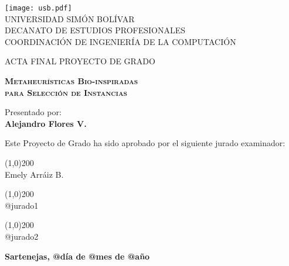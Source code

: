 \begin{titlepage}
\begin{center}

\texttt{[image: usb.pdf]} \\

\textsc {\large UNIVERSIDAD SIMÓN BOLÍVAR} \\
\textsc{DECANATO DE ESTUDIOS PROFESIONALES\\
COORDINACIÓN DE INGENIERÍA DE LA COMPUTACIÓN}

\bigskip
\bigskip
\bigskip
\bigskip
\bigskip
\bigskip

\textsc{ACTA FINAL PROYECTO DE GRADO}

\bigskip
\bigskip

\textsc{\bfseries Metaheurísticas Bio-inspiradas\\para Selección de Instancias}

\bigskip
\bigskip
\bigskip
\bigskip

\begin{minipage}{\textwidth}
\centering
Presentado por: \\
{\bfseries Alejandro Flores V.} \\

\bigskip
\bigskip
\bigskip

Este Proyecto de Grado ha sido aprobado por el siguiente jurado examinador: \\

\bigskip
\bigskip

\line(1,0){200} \\
Emely Arráiz B.\\

\bigskip
\bigskip

\line(1,0){200} \\
@jurado1\\

\bigskip
\bigskip

\line(1,0){200} \\
@jurado2\\
\end{minipage}

\bigskip
\bigskip
\vfill

{\large \bfseries Sartenejas, @día de @mes de @año}

\end{center}
\end{titlepage}
